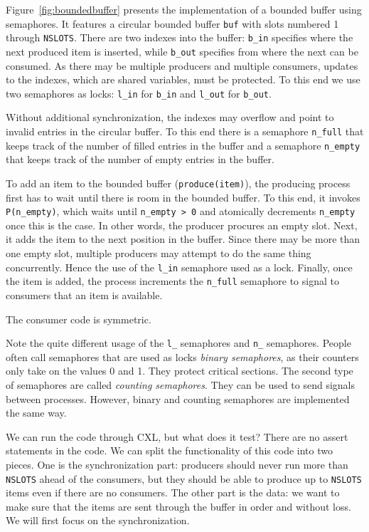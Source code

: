 \documentclass{report}
\begin{document}
Figure~\ref{fig:boundedbuffer} presents the implementation of a bounded
buffer using semaphores.  It features a circular bounded buffer \texttt{buf} with
slots numbered 1 through \texttt{NSLOTS}.  There are two indexes into
the buffer: \texttt{b\_in} specifies where the next produced item is inserted,
while \texttt{b\_out} specifies from where the next can be consumed.
As there may be multiple producers and multiple
consumers, updates to the indexes, which are shared variables, must be protected.
To this end we use two semaphores as locks: \texttt{l\_in} for \texttt{b\_in}
and \texttt{l\_out} for \texttt{b\_out}.

Without additional synchronization, the indexes may overflow and point to invalid
entries in the circular buffer.
To this end there is a semaphore \texttt{n\_full} that
keeps track of the number of filled entries in the buffer and a semaphore
\texttt{n\_empty} that keeps track of the number of empty entries in the buffer.

To add an item to the bounded buffer (\texttt{produce(item)}), the producing
process first has to wait until there is room in the bounded buffer.
To this end, it invokes \texttt{P(n\_empty)}, which waits until
\texttt{n\_empty > 0} and atomically decrements \texttt{n\_empty} once this
is the case.  In other words, the producer procures an empty slot.
Next, it adds the item to the next position in the buffer.
Since there may be more than one empty slot, multiple producers may attempt
to do the same thing concurrently.  Hence the use of the \texttt{l\_in}
semaphore used as a lock.  Finally, once the item is added, the process
increments the \texttt{n\_full} semaphore to signal to consumers that
an item is available.

The consumer code is symmetric.

Note the quite different usage of the \texttt{l\_} semaphores and \texttt{n\_}
semaphores.
People often call semaphores that are used as locks \emph{binary semaphores},
as their counters only take on the values 0 and 1.
They protect critical sections.
The second type of semaphores are called \emph{counting semaphores}.
They can be used to send signals between processes.
However, binary and counting semaphores are implemented the same way.

We can run the code through CXL, but what does it test?  There are no
assert statements in the code.
We can split the functionality of this code into two pieces.  One is
the synchronization part: producers should never run more than \texttt{NSLOTS}
ahead of the consumers, but they should be able to produce up to \texttt{NSLOTS}
items even if there are no consumers.  The other part is the data: we want
to make sure that the items are sent through the buffer in order and without
loss.  We will first focus on the synchronization.
\end{document}

